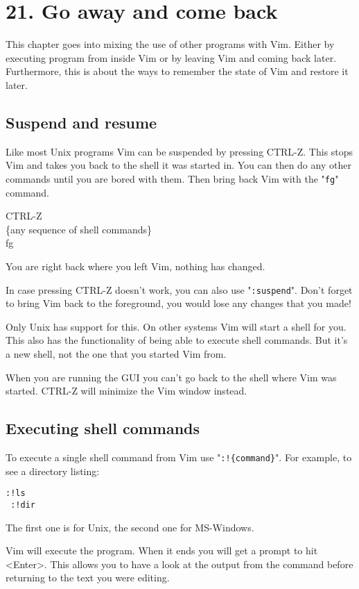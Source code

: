 \section{21. Go away and come back}
This chapter goes into mixing the use of other programs with Vim.
Either by executing program from inside Vim or by leaving Vim and coming back later.
Furthermore, this is about the ways to remember the state of Vim and restore it later.
\subsection{Suspend and resume}
Like most Unix programs Vim can be suspended by pressing CTRL-Z.
This stops Vim and takes you back to the shell it was started in.
You can then do any other commands until you are bored with them.
Then bring back Vim with the "\verb!fg!" command.

 CTRL-Z\\
 \{any sequence of shell commands\}\\
 fg

You are right back where you left Vim, nothing has changed.

In case pressing CTRL-Z doesn't work, you can also use "\verb!:suspend!".
Don't forget to bring Vim back to the foreground, you would lose any changes that you made!

Only Unix has support for this.
On other systems Vim will start a shell for you.
This also has the functionality of being able to execute shell commands.
But it's a new shell, not the one that you started Vim from.

When you are running the GUI you can't go back to the shell where Vim was started.
CTRL-Z will minimize the Vim window instead.
\subsection{Executing shell commands}
To execute a single shell command from Vim use "\verb,:!{command},".
For example, to see a directory listing:

\begin{Verbatim}[samepage=true]
 :!ls
 :!dir
\end{Verbatim}

The first one is for Unix, the second one for MS-Windows.

Vim will execute the program.
When it ends you will get a prompt to hit <Enter>.
This allows you to have a look at the output from the command before returning to the text you were editing.

